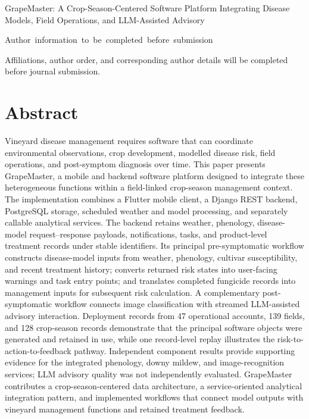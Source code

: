 \documentclass[12pt]{article}
\newcommand{\manuscripttitle}{GrapeMaster: A Crop-Season-Centered Software Platform Integrating Disease Models, Field Operations, and LLM-Assisted Advisory}
\begin{document}
\linenumbers

\begin{center}
{\LARGE{}\selectfont \manuscripttitle\par}
\end{center}

\vspace{0.8em}

\begingroup
\normalsize
{}
\noindent
\mbox{Author~information~to~be~completed~before~submission}
\par
\vspace{0.7em}

\noindent
Affiliations, author order, and corresponding author details will be completed before journal submission.
\par
\endgroup

\vspace{1em}

\section*{Abstract}

Vineyard disease management requires software that can coordinate environmental observations, crop development, modelled disease risk, field operations, and post-symptom diagnosis over time. This paper presents GrapeMaster, a mobile and backend software platform designed to integrate these heterogeneous functions within a field-linked crop-season management context. The implementation combines a Flutter mobile client, a Django REST backend, PostgreSQL storage, scheduled weather and model processing, and separately callable analytical services. The backend retains weather, phenology, disease-model request--response payloads, notifications, tasks, and product-level treatment records under stable identifiers. Its principal pre-symptomatic workflow constructs disease-model inputs from weather, phenology, cultivar susceptibility, and recent treatment history; converts returned risk states into user-facing warnings and task entry points; and translates completed fungicide records into management inputs for subsequent risk calculation. A complementary post-symptomatic workflow connects image classification with streamed LLM-assisted advisory interaction. Deployment records from 47 operational accounts, 139 fields, and 128 crop-season records demonstrate that the principal software objects were generated and retained in use, while one record-level replay illustrates the risk-to-action-to-feedback pathway. Independent component results provide supporting evidence for the integrated phenology, downy mildew, and image-recognition services; LLM advisory quality was not independently evaluated. GrapeMaster contributes a crop-season-centered data architecture, a service-oriented analytical integration pattern, and implemented workflows that connect model outputs with vineyard management functions and retained treatment feedback.
\end{document}
